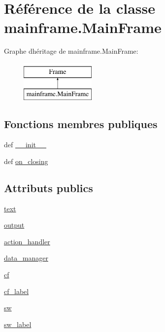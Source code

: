 \hypertarget{classmainframe_1_1_main_frame}{}\section{Référence de la classe mainframe.\+Main\+Frame}
\label{classmainframe_1_1_main_frame}
Graphe d\textquotesingle{}héritage de mainframe.\+Main\+Frame\+:\begin{figure}[H]
\begin{center}
\leavevmode
\includegraphics[height=2.000000cm]{classmainframe_1_1_main_frame}
\end{center}
\end{figure}
\subsection*{Fonctions membres publiques}
\begin{DoxyCompactItemize}
\item 
def \hyperlink{classmainframe_1_1_main_frame_ae273e00e7ef8318148092db1fbd31630}{\+\_\+\+\_\+init\+\_\+\+\_\+}
\item 
def \hyperlink{classmainframe_1_1_main_frame_a2756420d261b48a5b9136150f16d2c78}{on\+\_\+closing}
\end{DoxyCompactItemize}
\subsection*{Attributs publics}
\begin{DoxyCompactItemize}
\item 
\hyperlink{classmainframe_1_1_main_frame_af1af1736f4265c359d01ed94192f5be2}{text}
\item 
\hyperlink{classmainframe_1_1_main_frame_a0efaec7fc32e3ba7fd3bbf5091d00610}{output}
\item 
\hyperlink{classmainframe_1_1_main_frame_af7330830e57d05409e91fd989cbbcc5d}{action\+\_\+handler}
\item 
\hyperlink{classmainframe_1_1_main_frame_a2ea855c763e8591d4a828656f75ef6f1}{data\+\_\+manager}
\item 
\hyperlink{classmainframe_1_1_main_frame_adb97c2d753e9cd597624f159d89f1f88}{cf}
\item 
\hyperlink{classmainframe_1_1_main_frame_aecb8392168113d119289ab93e8cef97e}{cf\+\_\+label}
\item 
\hyperlink{classmainframe_1_1_main_frame_a054a0dcce14082157c43b37263189d07}{sw}
\item 
\hyperlink{classmainframe_1_1_main_frame_aef0c9dcafcd1e785dac074526d0cb8f1}{sw\+\_\+label}
\end{DoxyCompactItemize}



